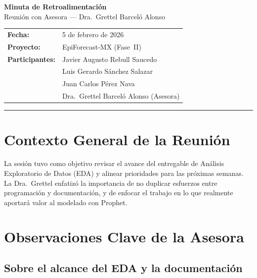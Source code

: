 \documentclass[11pt, a4paper]{article}
\begin{document}
\begin{center}
    {\LARGE\bfseries\color{imssgreen} Minuta de Retroalimentación}\\[6pt]
    {\large Reunión con Asesora --- Dra.\ Grettel Barceló Alonso}\\[16pt]
    \begin{tabular}{@{}ll@{}}
        \textbf{Fecha:}          & 5 de febrero de 2026 \\
        \textbf{Proyecto:}       & EpiForecast-MX (Fase~II) \\
        \textbf{Participantes:}  & Javier Augusto Rebull Saucedo \\
                                 & Luis Gerardo Sánchez Salazar \\
                                 & Juan Carlos Pérez Nava \\
                                 & Dra.\ Grettel Barceló Alonso (Asesora) \\
    \end{tabular}
\end{center}

\vspace{1em}
\hrule
\vspace{1.2em}

\section{Contexto General de la Reunión}

La sesión tuvo como objetivo revisar el avance del entregable de Análisis Exploratorio de Datos (EDA) y alinear prioridades para las próximas semanas. La Dra.\ Grettel enfatizó la importancia de no duplicar esfuerzos entre programación y documentación, y de enfocar el trabajo en lo que realmente aportará valor al modelado con Prophet.

\section{Observaciones Clave de la Asesora}

\subsection{Sobre el alcance del EDA y la documentación}
\end{document}
